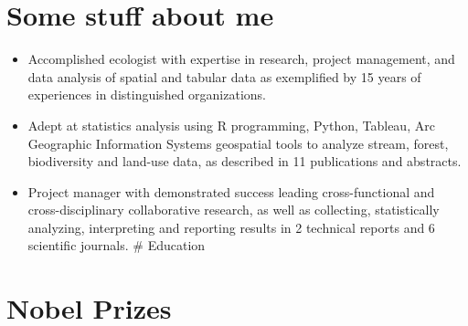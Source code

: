 \documentclass[10pt,a4paper,]{twentysecondcv}
\providecommand{\tightlist}{%
  \setlength{\itemsep}{0pt}\setlength{\parskip}{0pt}}
\begin{document}



\makeprofile %




\hypertarget{some-stuff-about-me}{%
\section{Some stuff about me}\label{some-stuff-about-me}}

\begin{itemize}
\tightlist
\item
  Accomplished ecologist with expertise in research, project management,
  and data analysis of spatial and tabular data as exemplified by 15
  years of experiences in distinguished organizations.
\item
  Adept at statistics analysis using R programming, Python, Tableau, Arc
  Geographic Information Systems geospatial tools to analyze stream,
  forest, biodiversity and land-use data, as described in 11
  publications and abstracts.
\item
  Project manager with demonstrated success leading cross-functional and
  cross-disciplinary collaborative research, as well as collecting,
  statistically analyzing, interpreting and reporting results in 2
  technical reports and 6 scientific journals. \# Education \nopagebreak

  \begin{twenty}
  \end{twenty}
\end{itemize}

\hypertarget{nobel-prizes}{%
\section{Nobel Prizes}\label{nobel-prizes}}
\end{document}
